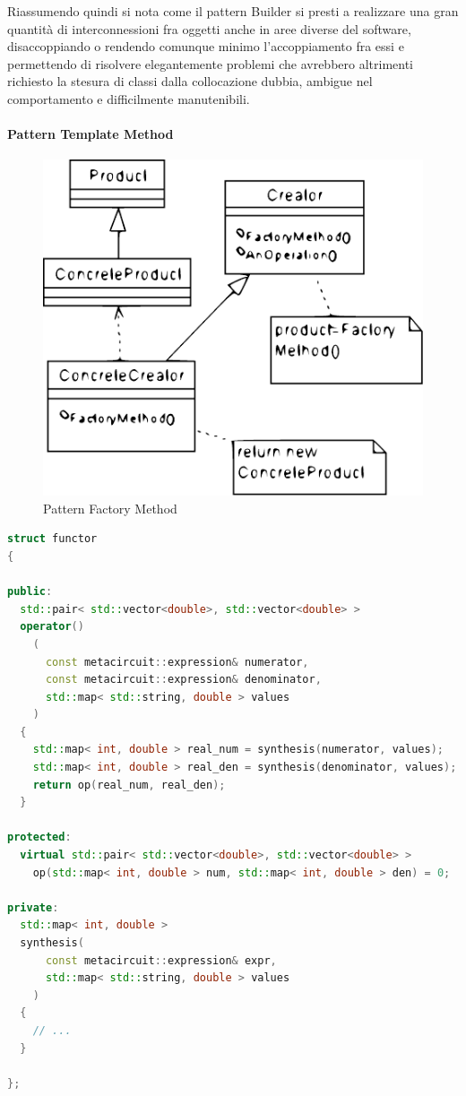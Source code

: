 Riassumendo quindi si nota come il pattern Builder si presti a realizzare una gran quantità di interconnessioni fra oggetti anche in aree diverse del software, disaccoppiando o rendendo comunque minimo l'accoppiamento fra essi e permettendo di risolvere elegantemente problemi che avrebbero altrimenti richiesto la stesura di classi dalla collocazione dubbia, ambigue nel comportamento e difficilmente manutenibili.

\paragraph{Pattern Template Method}

\begin{figure}[ht]
 \centering
 \includegraphics{immagini/factorymethod.pdf}
 \caption{Pattern Factory Method}
 \label{fig:factorymethod}
\end{figure}

\begin{lstlisting}[basicstyle=\small,language=C++,caption={Pattern Template Method in QSapecNG},float,label={lst:templatemethod},captionpos=b,frame=lines]
struct functor
{

public:
  std::pair< std::vector<double>, std::vector<double> >
  operator()
    (
      const metacircuit::expression& numerator,
      const metacircuit::expression& denominator,
      std::map< std::string, double > values
    )
  {
    std::map< int, double > real_num = synthesis(numerator, values);
    std::map< int, double > real_den = synthesis(denominator, values);
    return op(real_num, real_den);
  }

protected:
  virtual std::pair< std::vector<double>, std::vector<double> >
    op(std::map< int, double > num, std::map< int, double > den) = 0;

private:
  std::map< int, double >
  synthesis(
      const metacircuit::expression& expr,
      std::map< std::string, double > values
    )
  {
    // ...
  }

};
\end{lstlisting}

